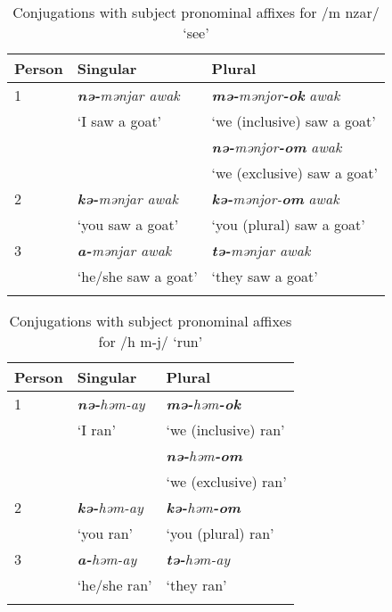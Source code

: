 \begin{table}
\begin{tabular}{lll}
\lsptoprule
{Person} & {Singular} & {Plural}\\\midrule
{1} & \textit{\textbf{nə-}mənjar awak} & \textbf{\textit{mə-}}\textit{mənjor}\textbf{\textit{{}-ok}} \textit{awak}\\
& ‘I saw a goat’ & ‘we (inclusive) saw a goat’\\
&  & \textbf{\textit{nə-}}\textit{mənjor}\textbf{\textit{{}-om}} \textit{awak}\\
& & ‘we (exclusive) saw a goat’\\\midrule
{2} & \textbf{\textit{kə-}}\textit{mənjar awak} & \textbf{\textit{kə-}}\textit{mənjor-}\textbf{\textit{om}} \textit{awak}\\
& ‘you saw a goat’  & ‘you (plural) saw a goat’\\\midrule
{3} & \textbf{\textit{a-}}\textit{mənjar awak} & \textbf{\textit{tə-}}\textit{mənjar awak}\\    
& ‘he/she saw a goat’  & ‘they saw a goat’\\
\lspbottomrule
\end{tabular}
\caption{Conjugations with subject pronominal affixes for /m nzar/ ‘see’}\label{tab:56}
\end{table}

\begin{table}
\begin{tabular}{lll}
\lsptoprule
{Person} & {Singular} & {Plural}\\\midrule
{1} & \textbf{\textit{nə-}}\textit{həm-ay} & \textbf{\textit{mə{}-}}\textit{həm}\textbf{\textit{{}-ok}}  \\
& ‘I ran’ & ‘we (inclusive) ran’\\
&  & \textbf{\textit{nə{}-}}\textit{həm}\textbf{\textit{{}-om}} \\  
& & ‘we (exclusive) ran’\\\midrule
{2} & \textbf{\textit{kə-}}\textit{həm-ay}  & \textbf{\textit{kə{}-}}\textit{həm}\textbf{\textit{{}-om}}\\
& ‘you ran’ & ‘you (plural) ran’\\\midrule
{3} & \textbf{\textit{a-}}\textit{həm-ay} & \textbf{\textit{tə-}}\textit{həm-ay}\\
& ‘he/she ran’ & ‘they ran’\\
\lspbottomrule
\end{tabular}
\caption {\label{tab:57} Conjugations with subject pronominal affixes for /h m-j/ ‘run’}
\end{table}

